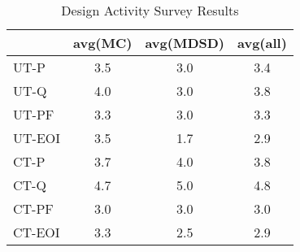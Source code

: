 \documentclass[final_report_innit.tex]{subfiles}
\begin{document}
\begin{table}[h]
\caption{Design Activity Survey Results}
\centering
\begin{tabular}{@{}l|c|c|c|@{}}
\cmidrule(l){2-4}
                             & \multicolumn{1}{l|}{avg(MC)} & \multicolumn{1}{l|}{avg(MDSD)} & \multicolumn{1}{l|}{avg(all)} \\ \midrule
\multicolumn{1}{|l|}{UT-P}   & 3.5                          & 3.0                           & 3.4                           \\ \midrule
\multicolumn{1}{|l|}{UT-Q}   & 4.0                          & 3.0                           & 3.8                           \\ \midrule
\multicolumn{1}{|l|}{UT-PF}  & 3.3                          & 3.0                           & 3.3                           \\ \midrule
\multicolumn{1}{|l|}{UT-EOI} & 3.5                          & 1.7                           & 2.9                           \\ \midrule
\multicolumn{1}{|l|}{CT-P}   & 3.7                          & 4.0                           & 3.8                           \\ \midrule
\multicolumn{1}{|l|}{CT-Q}   & 4.7                          & 5.0                           & 4.8                           \\ \midrule
\multicolumn{1}{|l|}{CT-PF}  & 3.0                          & 3.0                           & 3.0                           \\ \midrule
\multicolumn{1}{|l|}{CT-EOI} & 3.3                          & 2.5                           & 2.9                           \\ \bottomrule
\end{tabular}
\end{table}
\end{document}
